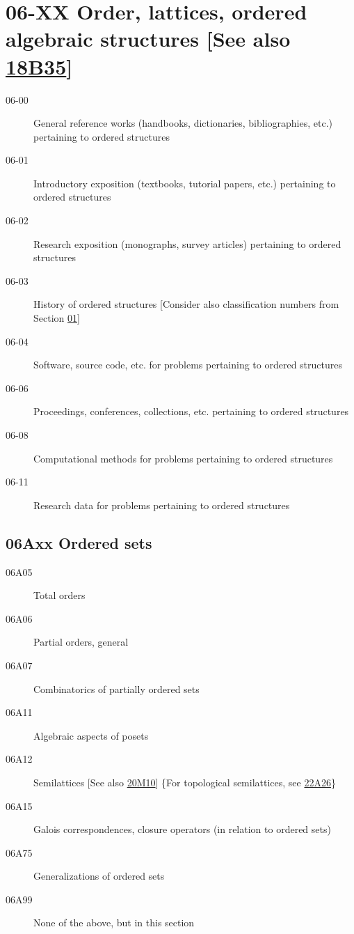 \documentclass[letterpaper]{article}
\begin{document}
\section*{06-XX Order, lattices, ordered algebraic structures [See also \hyperref[18B35]{18B35}] }\label{06-XX}
\begin{description}
\item [06-00]\label{06-00} General reference works (handbooks, dictionaries, bibliographies, etc.) pertaining to ordered structures
\item [06-01]\label{06-01} Introductory exposition (textbooks, tutorial papers, etc.) pertaining to ordered structures
\item [06-02]\label{06-02} Research exposition (monographs, survey articles) pertaining to ordered structures
\item [06-03]\label{06-03} History of ordered structures [Consider also classification numbers from Section \hyperref[01-XX]{01}]
\item [06-04]\label{06-04} Software, source code, etc. for problems pertaining to ordered structures
\item [06-06]\label{06-06} Proceedings, conferences, collections, etc. pertaining to ordered structures
\item [06-08]\label{06-08} Computational methods for problems pertaining to ordered structures
\item [06-11]\label{06-11} Research data for problems pertaining to ordered structures
\end{description}
\subsection*{06Axx  Ordered sets }\label{06Axx}
\begin{description}  
\item [06A05]\label{06A05} Total orders
\item [06A06]\label{06A06} Partial orders, general
\item [06A07]\label{06A07} Combinatorics of partially ordered sets
\item [06A11]\label{06A11} Algebraic aspects of posets
\item [06A12]\label{06A12} Semilattices [See also \hyperref[20M10]{20M10}] \{For topological semilattices, see \hyperref[22A26]{22A26}\}
\item [06A15]\label{06A15} Galois correspondences, closure operators (in relation to ordered sets)
\item [06A75]\label{06A75} Generalizations of ordered sets
\item [06A99]\label{06A99} None of the above, but in this section
\end{description}
\end{document}
